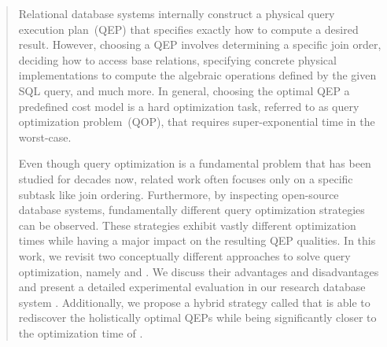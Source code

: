 \begin{abstract}
Relational database systems internally construct a physical query execution plan~(QEP) that specifies exactly how to compute a desired result.  However, choosing a QEP involves determining a specific join order, deciding how to access base relations, specifying concrete physical implementations to compute the algebraic operations defined by the given SQL query, and much more.  In general, choosing the optimal QEP \wrt a predefined cost model is a hard optimization task, referred to as query optimization problem~(QOP), that requires super-exponential time in the worst-case.

Even though query optimization is a fundamental problem that has been studied for decades now, related work often focuses only on a specific subtask like join ordering.  Furthermore, by inspecting open-source database systems, fundamentally different query optimization strategies can be observed.  These strategies exhibit vastly different optimization times while having a major impact on the resulting QEP qualities.  In this work, we revisit two conceptually different approaches to solve query optimization, namely \split and \holistic.  We discuss their advantages and disadvantages and present a detailed experimental evaluation in our research database system \mutable.  Additionally, we propose a hybrid strategy called \topk that is able to rediscover the holistically optimal QEPs while being significantly closer to the optimization time of \split.
\end{abstract}
